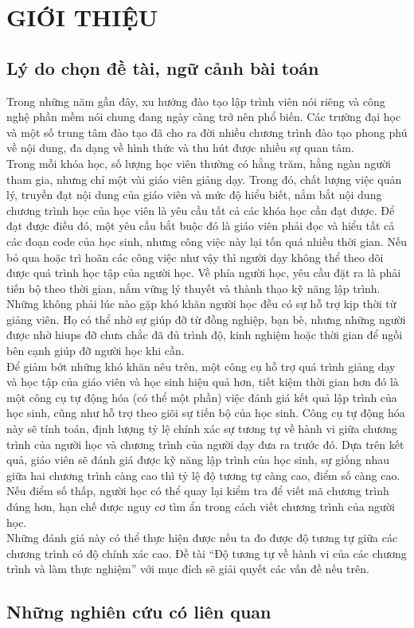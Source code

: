 \newpage
\chapter{GIỚI THIỆU}

\section{Lý do chọn đề tài, ngữ cảnh bài toán}
		
Trong những năm gần đây, xu hướng đào tạo lập trình viên nói riêng và công nghệ phần mềm nói chung đang ngày càng trở nên phổ biến. Các trường đại học và một số trung tâm đào tạo đã cho ra đời nhiều chương trình đào tạo phong phú về nội dung, đa dạng về hình thức và thu hút được nhiều sự quan tâm.\\
	
Trong mỗi khóa học, số lượng học viên thường có hằng trăm, hằng ngàn người tham gia, nhưng chỉ một vài giáo viên giảng dạy. Trong đó, chất lượng việc quản lý, truyền đạt nội dung của giáo viên và mức độ hiểu biết, nắm bắt nội dung chương trình học của học viên là yêu cầu tất cả các khóa học cần đạt được. Để đạt được điều đó, một yêu cầu bắt buộc đó là giáo viên phải đọc và hiểu tất cả các đoạn code của học sinh, nhưng công việc này lại tốn quá nhiều thời gian. Nếu bỏ qua hoặc trì hoãn các công việc như vậy thì người dạy không thể theo dõi được quá trình học tập của người học. Về phía người học, yêu cầu đặt ra là phải tiến bộ theo thời gian, nắm vững lý thuyết và thành thạo kỹ năng lập trình. Những không phải lúc nào gặp khó khăn người học đều có sự hỗ trợ kịp thời từ giảng viên. Họ có thể nhờ sự giúp đỡ từ đồng nghiệp, bạn bè, nhưng những người được nhờ hiups đỡ chưa chắc đã đủ trình độ, kinh nghiệm hoặc thời gian để ngồi bên cạnh giúp đỡ người học khi cần.\\
	
Để giảm bớt những khó khăn nêu trên, một công cụ hỗ trợ quá trình giảng dạy và học tập của giáo viên và học sinh hiệu quả hơn, tiết kiệm thời gian hơn đó là một công cụ tự động hóa (có thể một phần) việc đánh giá kết quả lập trình của học sinh, cũng như hỗ trợ theo giõi sự tiến bộ của học sinh. Công cụ tự động hóa này sẽ tính toán, định lượng tỷ lệ chính xác sự tương tự về hành vi giữa chương trình của người học và chương trình của người dạy đưa ra trước đó. Dựa trên kết quả, giáo viên sẽ đánh giá được kỹ năng lập trình của học sinh, sự giống nhau giữa hai chương trình càng cao thì tỷ lệ độ tương tự càng cao, điểm số càng cao. Nếu điểm số thấp, người học có thể quay lại kiểm tra để viết mã chương trình đúng hơn, hạn chế được nguy cơ tìm ẩn trong cách viết chương trình của người học.\\
	
Những đánh giá này có thể thực hiện được nếu ta đo được độ tương tự giữa các chương trình có độ chính xác cao. Đề tài “Độ tương tự về hành vi của các chương trình và làm thực nghiệm”  với mục đích sẽ giải quyết các vấn đề nếu trên.

\section{Những nghiên cứu có liên quan}